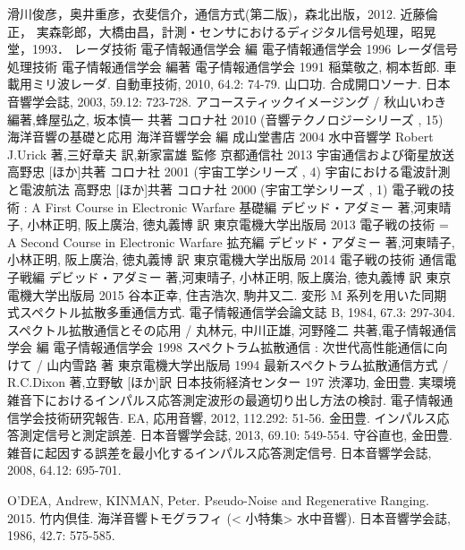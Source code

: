 \begin{thebibliography}{99}
 滑川俊彦，奥井重彦，衣斐信介，通信方式(第二版)，森北出版，2012.
 近藤倫正， 実森彰郎，大橋由昌，計測・センサにおけるディジタル信号処理，昭晃堂，1993．
 レーダ技術 電子情報通信学会 編 電子情報通信学会 1996
 レーダ信号処理技術 電子情報通信学会 編著 電子情報通信学会 1991
 稲葉敬之, 桐本哲郎. 車載用ミリ波レーダ. 自動車技術, 2010, 64.2: 74-79.
 山口功. 合成開口ソーナ. 日本音響学会誌, 2003, 59.12: 723-728.
 アコースティックイメージング / 秋山いわき 編著,蜂屋弘之, 坂本慎一 共著 コロナ社 2010 (音響テクノロジーシリーズ , 15)
 海洋音響の基礎と応用 海洋音響学会 編 成山堂書店 2004
 水中音響学 Robert J.Urick 著,三好章夫 訳,新家富雄 監修 京都通信社 2013
 宇宙通信および衛星放送 高野忠 [ほか]共著 コロナ社 2001 (宇宙工学シリーズ , 4)
 宇宙における電波計測と電波航法 高野忠 [ほか]共著 コロナ社 2000 (宇宙工学シリーズ , 1)
 電子戦の技術 : A First Course in Electronic Warfare 基礎編 デビッド・アダミー 著,河東晴子, 小林正明, 阪上廣治, 徳丸義博 訳 東京電機大学出版局 2013
 電子戦の技術 = A Second Course in Electronic Warfare 拡充編 デビッド・アダミー 著,河東晴子, 小林正明, 阪上廣治, 徳丸義博 訳 東京電機大学出版局 2014
 電子戦の技術 通信電子戦編 デビッド・アダミー 著,河東晴子, 小林正明, 阪上廣治, 徳丸義博 訳 東京電機大学出版局 2015
 谷本正幸, 住吉浩次, 駒井又二. 変形 M 系列を用いた同期式スペクトル拡散多重通信方式. 電子情報通信学会論文誌 B, 1984, 67.3: 297-304.
 スペクトル拡散通信とその応用 / 丸林元, 中川正雄, 河野隆二 共著,電子情報通信学会 編 電子情報通信学会 1998
 スペクトラム拡散通信 : 次世代高性能通信に向けて / 山内雪路 著 東京電機大学出版局 1994
 最新スペクトラム拡散通信方式 / R.C.Dixon 著,立野敏 [ほか]訳 日本技術経済センター 197
 渋澤功, 金田豊. 実環境雑音下におけるインパルス応答測定波形の最適切り出し方法の検討. 電子情報通信学会技術研究報告. EA, 応用音響, 2012, 112.292: 51-56.
 金田豊. インパルス応答測定信号と測定誤差. 日本音響学会誌, 2013, 69.10: 549-554.
 守谷直也, 金田豊. 雑音に起因する誤差を最小化するインパルス応答測定信号. 日本音響学会誌, 2008, 64.12: 695-701.


 O’DEA, Andrew, KINMAN, Peter. Pseudo-Noise and Regenerative Ranging. 2015.
 竹内倶佳. 海洋音響トモグラフィ (< 小特集> 水中音響). 日本音響学会誌, 1986, 42.7: 575-585.


\end{thebibliography}
